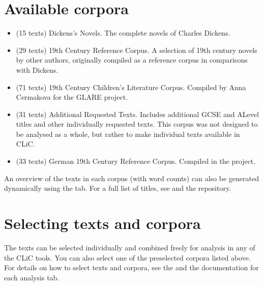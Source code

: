 \documentclass[letterpaper,10pt,english]{sphinxmanual}
\begin{document}
\section{Available corpora}
\label{\detokenize{cliccorpora:available-corpora}}\begin{itemize}
\item {} 
\sphinxAtStartPar
{} (15 texts) \textendash{} Dickens’s Novels. The complete novels of
Charles Dickens.

\item {} 
\sphinxAtStartPar
{} (29 texts) \textendash{} 19th Century Reference Corpus. A selection of
19th century novels by other authors, originally compiled as a reference corpus
in comparisons with Dickens.

\item {} 
\sphinxAtStartPar
{} (71 texts) \textendash{} 19th Century Children’s Literature Corpus.
Compiled by Anna Cermakova for the GLARE project.

\item {} 
\sphinxAtStartPar
{} (31 texts) \textendash{} Additional Requested Texts. Includes
additional GCSE and A\sphinxhyphen{}Level titles and other individually requested
texts. This corpus was not designed to be analysed as a whole, but
rather to make individual texts available in CLiC.

\item {} 
\sphinxAtStartPar
{} (33 texts) \textendash{} German 19th Century Reference Corpus. Compiled in the  project.

\end{itemize}

\sphinxAtStartPar
An overview of the texts in each corpus (with word counts) can also be
generated dynamically using the {\hyperref[\detokenize{clicanalysis/counts:counts}]{}} tab. For a full list of
titles, see {\hyperref[\detokenize{appendices:a-list-of-texts-available-in-clic}]{}} and the  repository.


\section{Selecting texts and corpora}
\label{\detokenize{cliccorpora:selecting-texts-and-corpora}}
\sphinxAtStartPar
The texts can be selected individually and combined freely for analysis
in any of the CLiC tools. You can also select one of the pre\sphinxhyphen{}selected
corpora listed above. For details on how to select texts and corpora,
see the {\hyperref[\detokenize{introduction:navigating-the-interface}]{}} and the
documentation for each analysis tab.
\end{document}
